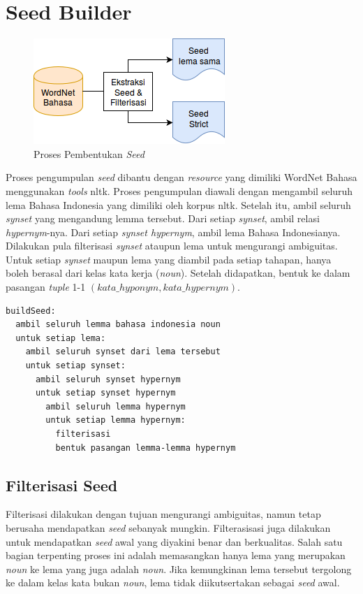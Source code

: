 \section{Seed Builder}
\begin{figure}
    \centering
    \includegraphics[scale=0.6]{pics/Pic02-SeedBuilder}
    \caption{Proses Pembentukan \textit{Seed}}
    \label{fig:seed-builder}
\end{figure}
Proses pengumpulan \textit{seed} dibantu dengan \textit{resource} yang dimiliki WordNet Bahasa menggunakan \textit{tools} nltk. Proses pengumpulan diawali dengan mengambil seluruh lema Bahasa Indonesia yang dimiliki oleh korpus nltk. Setelah itu, ambil seluruh \textit{synset} yang mengandung lemma tersebut. Dari setiap \textit{synset}, ambil relasi \textit{hypernym}-nya. Dari setiap \textit{synset hypernym}, ambil lema Bahasa Indonesianya. Dilakukan pula filterisasi \textit{synset} ataupun lema untuk mengurangi ambiguitas. Untuk setiap \textit{synset} maupun lema yang diambil pada setiap tahapan, hanya boleh berasal dari kelas kata kerja (\textit{noun}). Setelah didapatkan, bentuk ke dalam pasangan \textit{tuple} 1-1 $(kata\_hyponym,kata\_hypernym)$.
\begin{lstlisting}[caption={Algoritme pembentukan \textit{seed}}, language=bash]
buildSeed:
  ambil seluruh lemma bahasa indonesia noun
  untuk setiap lema:
    ambil seluruh synset dari lema tersebut
    untuk setiap synset:
      ambil seluruh synset hypernym
      untuk setiap synset hypernym 
        ambil seluruh lemma hypernym
        untuk setiap lemma hypernym:
          filterisasi
          bentuk pasangan lemma-lemma hypernym
\end{lstlisting}

\subsection{Filterisasi Seed}
Filterisasi dilakukan dengan tujuan mengurangi ambiguitas, namun tetap berusaha mendapatkan \textit{seed} sebanyak mungkin. Filterasisasi juga dilakukan untuk mendapatkan \textit{seed} awal yang diyakini benar dan berkualitas. Salah satu bagian terpenting proses ini adalah memasangkan hanya lema yang merupakan \textit{noun} ke lema yang juga adalah \textit{noun}. Jika kemungkinan lema tersebut tergolong ke dalam kelas kata bukan \textit{noun}, lema tidak diikutsertakan sebagai \textit{seed} awal.

